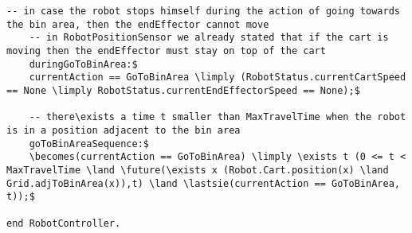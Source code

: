 \begin{lstlisting}[fontadjust, mathescape, frame=single]
    -- in case the robot stops himself during the action of going towards the bin area, then the endEffector cannot move
    -- in RobotPositionSensor we already stated that if the cart is moving then the endEffector must stay on top of the cart
    duringGoToBinArea:$
    currentAction == GoToBinArea \limply (RobotStatus.currentCartSpeed == None \limply RobotStatus.currentEndEffectorSpeed == None);$

    -- there\exists a time t smaller than MaxTravelTime when the robot is in a position adjacent to the bin area
    goToBinAreaSequence:$
    \becomes(currentAction == GoToBinArea) \limply \exists t (0 <= t < MaxTravelTime \land \future(\exists x (Robot.Cart.position(x) \land Grid.adjToBinArea(x)),t) \land \lastsie(currentAction == GoToBinArea, t));$
                    
end RobotController.
\end{lstlisting}